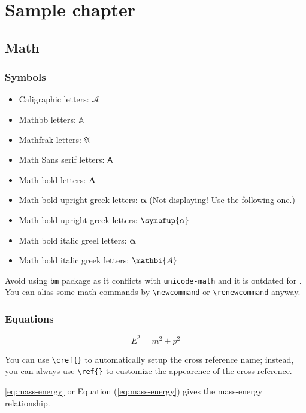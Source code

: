 \chapter{Sample chapter}

\section{Math}

\subsection{Symbols}

\begin{itemize}
  \item Caligraphic letters: $\mathcal{A}$ 
  \item Mathbb letters: $\mathbb{A}$
  \item Mathfrak letters: $\mathfrak{A}$
  \item Math Sans serif letters: $\mathsf{A}$
  \item Math bold letters: $\mathbf{A}$
  \item Math bold upright greek letters: $\mathbf{\alpha}$ (Not displaying! Use the following one.)
  \item Math bold upright greek letters: $\symbfup{\alpha}$
  \item Math bold italic greel letters: $\bm{\alpha}$
  \item Math bold italic greek letters: $\mathbi{A}$
\end{itemize}

Avoid using \lstinline|bm| package as it conflicts with \lstinline|unicode-math| and it is outdated for .
You can alias some math commands by \lstinline|\newcommand| or \lstinline|\renewcommand| anyway.

\subsection{Equations}

\begin{equation}
  E^2 = m^2 + p^2\label{eq:mass-energy}
\end{equation}

You can use \lstinline|\cref{}| to automatically setup the cross reference name; instead, you can always use \lstinline|\ref{}| to customize the appearence of the cross reference.

\cref{eq:mass-energy} or Equation (\ref{eq:mass-energy}) gives the mass-energy relationship.

